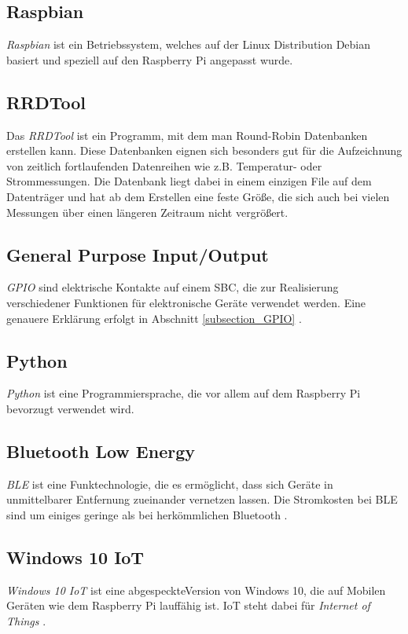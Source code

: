 \subsection*{Raspbian}
\textit{Raspbian} ist ein Betriebssystem, welches auf der Linux Distribution Debian basiert und speziell auf den Raspberry Pi angepasst wurde.

\subsection*{RRDTool}
Das \textit{RRDTool} ist ein Programm, mit dem man Round-Robin Datenbanken erstellen kann. Diese Datenbanken eignen sich besonders gut für die Aufzeichnung von zeitlich fortlaufenden Datenreihen wie z.B. Temperatur- oder Strommessungen. Die Datenbank liegt dabei in einem einzigen File auf dem Datenträger und hat ab dem Erstellen eine feste Größe, die sich auch bei vielen Messungen über einen längeren Zeitraum nicht vergrößert. 

\subsection*{General Purpose Input/Output}
\textit{\ac{GPIO}} sind elektrische Kontakte auf einem SBC, die zur Realisierung verschiedener Funktionen für elektronische Geräte verwendet werden. Eine genauere Erklärung erfolgt in Abschnitt \ref{subsection_GPIO} \citep{Raspberri_Pi_Handbuch}.

\subsection*{Python}
\textit{Python} ist eine Programmiersprache, die vor allem auf dem Raspberry Pi bevorzugt verwendet wird.

\subsection*{Bluetooth Low Energy}
\textit{\ac{BLE}} ist eine Funktechnologie, die es ermöglicht, dass sich Geräte in unmittelbarer Entfernung zueinander vernetzen lassen. Die Stromkosten bei \ac{BLE} sind um einiges geringe als bei herkömmlichen Bluetooth \citep{Bluetooth_Low_Energy}.
\subsection*{Windows 10 IoT}
\textit{Windows 10 IoT} ist eine \glqq abgespeckte\grqq \;Version von Windows 10, die auf Mobilen Geräten wie dem Raspberry Pi lauffähig ist. IoT steht dabei für \textit{Internet of Things} \citep{Raspberri_Pi_Handbuch}.

